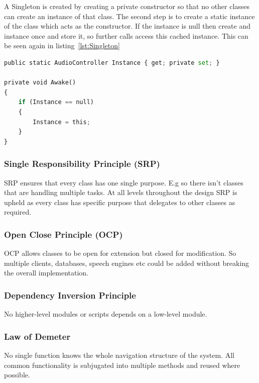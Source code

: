 A Singleton is created by creating a private constructor so that no other classes can create an instance of that class. The second step is to create a static instance of the class which acts as the constructor. If the instance is null then create and instance once and store it, so further calls access this cached instance. This can be seen again in listing~\ref{lst:Singleton}

\begin{lstlisting}[caption={Singleton - implemented in the AudioController script.},label={lst:Singleton},language=python]
public static AudioController Instance { get; private set; }

private void Awake()
{
    if (Instance == null)
    {
        Instance = this;
    }
}
\end{lstlisting}

\subsubsection{Single Responsibility Principle (SRP)}
SRP ensures that every class has one single purpose. E.g so there isn't classes that are handling multiple tasks. At all levels throughout the design SRP is upheld as every class has specific purpose that delegates to other classes as required.

\subsubsection{Open Close Principle (OCP)}
OCP allows classes to be open for extension but closed for modification. So multiple clients, databases, speech engines etc could be added without breaking the overall implementation.

\subsubsection{Dependency Inversion Principle}
No higher-level modules or scripts depends on a low-level module. 

\subsubsection{Law of Demeter}
No single function knows the whole navigation structure of the system. All common functionality is subjugated into multiple methods and reused where possible.

